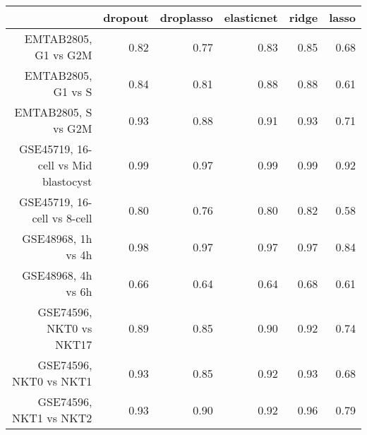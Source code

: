 \begin{table}[ht]
\centering
\begin{tabular}{rrrrrr}
  \hline
 & dropout & droplasso & elasticnet & ridge & lasso \\ 
  \hline
EMTAB2805, G1 vs G2M & 0.82 & 0.77 & 0.83 & 0.85 & 0.68 \\ 
  EMTAB2805, G1 vs S & 0.84 & 0.81 & 0.88 & 0.88 & 0.61 \\ 
  EMTAB2805, S vs G2M & 0.93 & 0.88 & 0.91 & 0.93 & 0.71 \\ 
  GSE45719, 16-cell vs Mid blastocyst & 0.99 & 0.97 & 0.99 & 0.99 & 0.92 \\ 
  GSE45719, 16-cell vs 8-cell & 0.80 & 0.76 & 0.80 & 0.82 & 0.58 \\ 
  GSE48968, 1h vs 4h & 0.98 & 0.97 & 0.97 & 0.97 & 0.84 \\ 
  GSE48968, 4h vs 6h & 0.66 & 0.64 & 0.64 & 0.68 & 0.61 \\ 
  GSE74596, NKT0 vs NKT17 & 0.89 & 0.85 & 0.90 & 0.92 & 0.74 \\ 
  GSE74596, NKT0 vs NKT1 & 0.93 & 0.85 & 0.92 & 0.93 & 0.68 \\ 
  GSE74596, NKT1 vs NKT2 & 0.93 & 0.90 & 0.92 & 0.96 & 0.79 \\ 
   \hline
\end{tabular}
\end{table}
